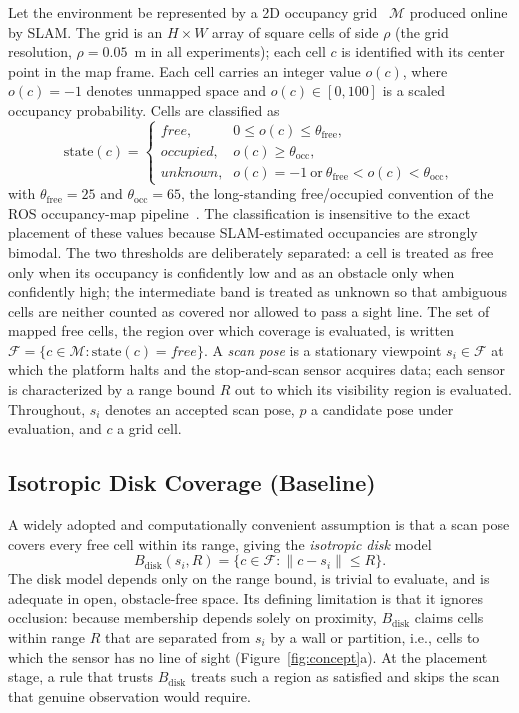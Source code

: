 Let the environment be represented by a 2D occupancy grid~\cite{elfes1989,thrun2005}
$\mathcal{M}$ produced online by SLAM. The grid is an $H\times W$ array of
square cells of side $\rho$ (the grid resolution, $\rho=0.05$~m in all
experiments); each cell $c$ is identified with its center point in the map
frame. Each cell carries an integer value $o(c)$, where $o(c)=-1$ denotes
unmapped space and $o(c)\in[0,100]$ is a scaled occupancy probability. Cells
are classified as
\begin{equation}
\mathrm{state}(c)=
\begin{cases}
\textit{free}, & 0 \le o(c) \le \theta_{\mathrm{free}}, \\
\textit{occupied}, & o(c) \ge \theta_{\mathrm{occ}}, \\
\textit{unknown}, & o(c)=-1 \ \text{or}\ \theta_{\mathrm{free}}<o(c)<\theta_{\mathrm{occ}},
\end{cases}
\label{eq:state}
\end{equation}
with $\theta_{\mathrm{free}}=25$ and $\theta_{\mathrm{occ}}=65$, the
long-standing free/occupied convention of the ROS occupancy-map
pipeline~\cite{macenski2020marathon}. The classification is insensitive to the
exact placement of these values because SLAM-estimated occupancies are strongly
bimodal. The two thresholds are deliberately separated: a cell is treated as
free only when its occupancy is confidently low and as an obstacle only when
confidently high; the intermediate band is treated as unknown so that ambiguous
cells are neither counted as covered nor allowed to pass a sight line. The
set of mapped free cells, the region over which coverage is evaluated, is
written $\mathcal{F}=\{c\in\mathcal{M}:\mathrm{state}(c)=\textit{free}\}$. A
\emph{scan pose} is a stationary viewpoint $s_i\in\mathcal{F}$ at which the
platform halts and the stop-and-scan sensor acquires data; each sensor is
characterized by a range bound $R$ out to which its visibility region is
evaluated. Throughout, $s_i$ denotes an accepted scan pose, $p$ a candidate
pose under evaluation, and $c$ a grid cell.

\subsection{Isotropic Disk Coverage (Baseline)}
\label{subsec:disk}

A widely adopted and computationally convenient assumption is that a scan pose
covers every free cell within its range, giving the \emph{isotropic disk}
model
\begin{equation}
B_{\mathrm{disk}}(s_i,R)=\{c\in\mathcal{F}:\lVert c-s_i\rVert \le R\}.
\label{eq:disk}
\end{equation}
The disk model depends only on the range bound, is trivial to evaluate, and
is adequate in open, obstacle-free space. Its defining limitation is that it
ignores occlusion: because membership depends solely on proximity,
$B_{\mathrm{disk}}$ claims cells within range $R$ that are separated from $s_i$
by a wall or partition, i.e., cells to which the sensor has no line of sight
(Figure~\ref{fig:concept}a). At the placement stage, a rule that trusts
$B_{\mathrm{disk}}$ treats such a region as satisfied and skips the scan that
genuine observation would require.

